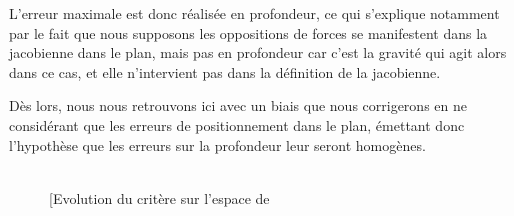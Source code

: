 L'erreur maximale est donc r\'ealis\'ee en profondeur, ce qui s'explique 
notamment par le fait que nous supposons les oppositions de forces se 
manifestent dans la jacobienne dans le plan, mais pas en profondeur car c'est la 
gravit\'e qui agit alors dans ce cas, et elle n'intervient pas dans la 
d\'efinition de la jacobienne.

D\`es lors, nous nous retrouvons ici avec un biais que nous corrigerons en ne 
consid\'erant que les erreurs de positionnement dans le plan, \'emettant donc 
l'hypoth\`ese que les erreurs sur la profondeur leur seront homog\`enes.

\begin{figure}[!htp]
  \centering
\hfill
     \\
\hfill
    \subfloat[Evolution du crit\`ere sur l'espace de 

\end{figure}
